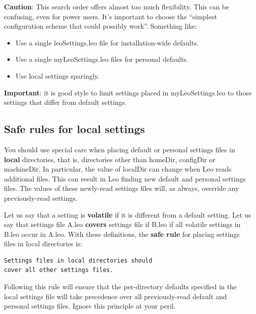 \documentclass[a4paper,10pt,english]{sphinxmanual}
\begin{document}
\textbf{Caution}: This search order offers almost too much flexibility. This can be
confusing, even for power users. It's important to choose the ``simplest
configuration scheme that could possibly work''.  Something like:
\begin{itemize}
\item {} 
Use a single leoSettings.leo file for installation-wide defaults.

\item {} 
Use a single myLeoSettings.leo files for personal defaults.

\item {} 
Use local settings sparingly.

\end{itemize}

\textbf{Important}: it is good style to limit settings placed in
myLeoSettings.leo to those settings that differ from default settings.


\subsection{Safe rules for local settings}
\label{customizing:safe-rules-for-local-settings}
You should use special care when placing default or personal settings files in
\textbf{local} directories, that is, directories other than homeDir, configDir or
machineDir. In particular, the value of localDir can change when Leo reads
additional files. This can result in Leo finding new default and personal
settings files. The values of these newly-read settings files will, as always,
override any previously-read settings.

Let us say that a setting is \textbf{volatile} if it is different from a default
setting. Let us say that settings file A.leo \textbf{covers} settings file if B.leo
if all volatile settings in B.leo occur in A.leo. With these definitions, the
\textbf{safe rule} for placing settings files in local directories is:

\begin{Verbatim}[commandchars=\\\{\}]
Settings files in local directories should
cover all other settings files.
\end{Verbatim}

Following this rule will ensure that the per-directory defaults specified in the
local settings file will take precedence over all previously-read default and
personal settings files. Ignore this principle at your peril.
\end{document}
